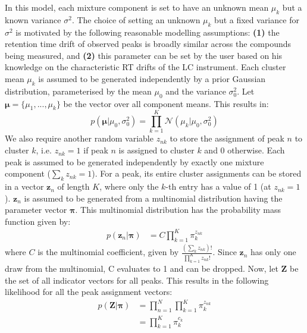 In this model, each mixture component is set to have an unknown mean $\mu_{k}$ but a known variance $\sigma^2$. The choice of setting an unknown $\mu_k$ but a fixed variance for $\sigma^2$ is motivated by the following reasonable modelling assumptions: \textbf{(1)} the retention time drift of observed peaks is broadly similar across the compounds being measured, and \textbf{(2)} this parameter can be set by the user based on his knowledge on the characteristic RT drifts of the LC instrument. Each cluster mean $\mu_k$ is assumed to be generated independently by a prior Gaussian distribution, parameterised by the mean $\mu_0$ and the variance $\sigma^2_0$. Let $\boldsymbol{\mu}=\{\mu_{1},...,\mu_{k}\}$ be the vector over all component means. This results in:
\begin{equation}
p(\boldsymbol{\mu} \vert \mu_0, \sigma^2_0) = \prod_{k=1}^K \mathcal{N}(\mu_k \vert \mu_0, \sigma^2_0)
\label{eq:background-prior-gaussian}
\end{equation}
We also require another random variable $z_{nk}$ to store the assignment of peak $n$ to cluster $k$, i.e. $z_{nk}=1$ if peak $n$ is assigned to cluster $k$ and 0 otherwise. Each peak is assumed to be generated independently by exactly one mixture component ($\sum_{k} z_{nk} = 1$). For a peak, its entire cluster assignments can be stored in a vector $\boldsymbol{z}_{n}$ of length $K$, where only the $k$-th entry has a value of 1 (at $z_{nk}=1$). $\boldsymbol{z}_{n}$ is assumed to be generated from a multinomial distribution having the parameter vector $\boldsymbol{\pi}$. This multinomial distribution has the probability mass function given by:
\begin{equation}
\begin{aligned}
p(\boldsymbol{z}_n \vert \boldsymbol{\pi}) &= C \prod_{k=1}^{K} \pi_k^{z_{nk}}
\end{aligned}
\label{eq:background-zn_pmf}
\end{equation}
where $C$ is the multinomial coefficient, given by $\frac{(\sum_k z_{nk})!}{\prod_{k=1}^K z_{nk}!}$. Since $\boldsymbol{z}_{n}$ has only one draw from the multinomial, C evaluates to 1 and can be dropped. Now, let $\boldsymbol{Z}$ be the set of all indicator vectors for all peaks. This results in the following likelihood for all the peak assignment vectors:
\begin{equation}
\begin{aligned}
p(\boldsymbol{Z} \vert \boldsymbol{\pi}) &= \prod_{n=1}^N \prod_{k=1}^{K} \pi_k^{z_{nk}} \\
                                                              &= \prod_{k=1}^{K} \pi_k^{c_{k}}
\end{aligned}
\label{eq:background-z-given-pi}
\end{equation}
